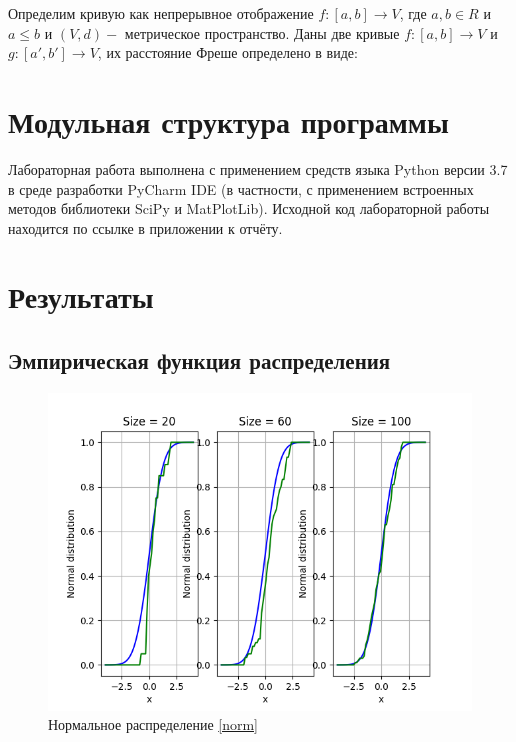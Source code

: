 \documentclass[a4paper]{article}
\begin{document}
            Определим кривую как непрерывное отображение $f : [a, b] \rightarrow V$, где $a, b \in R$ и $a \leq b$ и $(V, d) - $ метрическое пространство.  Даны две кривые $f : [a, b] \rightarrow V$ и $g : [a', b'] \rightarrow V$, их расстояние Фреше определено в виде:
            

\section{Модульная структура программы}
    Лабораторная работа выполнена с применением средств языка Python версии 3.7 в среде разработки PyCharm IDE (в частности, с применением встроенных методов библиотеки SciPy и MatPlotLib). Исходной код лабораторной работы находится по ссылке в приложении к отчёту.
\section{Результаты}
    \subsection{Эмпирическая функция распределения}
        \begin{figure}[H]
            \centering
            \includegraphics[scale = 0.4]{normal_distrib.png}
            \caption{Нормальное распределение \eqref{norm}}
            \label{fig:normal}
        \end{figure}
        
\end{document}
